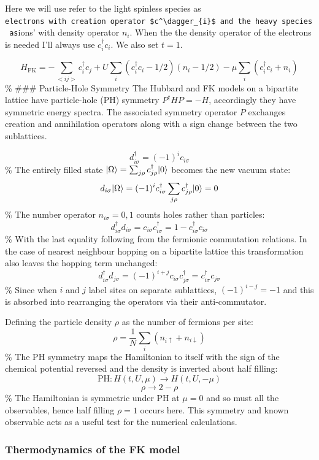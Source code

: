 Here we will use refer to the light spinless species as \texttt{electrons\textquotesingle{}\ with\ creation\ operator\ \$c\^{}\textbackslash{}dagger\_\{i\}\$\ and\ the\ heavy\ species\ as}ions' with density operator \(n_i\). When the the density operator of the electrons is needed I'll always use \(c^\dagger_{i}c_{i}\). We also set \(t = 1\).

\[
    H_{\mathrm{FK}} = -\sum_{<ij>} c^\dagger_{i}c_{j} + U \sum_{i} (c^\dagger_{i}c_{i} - 1/2)( n_i - 1/2) - \mu \sum_i \left(c^\dagger_{i}c_{i} + n_{i}\right)
\] \% \#\#\# Particle-Hole Symmetry The Hubbard and FK models on a bipartite lattice have particle-hole (PH) symmetry \(P^\dagger H P = - H\), accordingly they have symmetric energy spectra. The associated symmetry operator \(P\) exchanges creation and annihilation operators along with a sign change between the two sublattices.

\[ d^\dagger_{i\sigma} = (-1)^i c_{i\sigma}\] \% The entirely filled state \(|\Omega\rangle = \sum_{j\rho} c^\dagger_{j\rho} |0\rangle\) becomes the new vacuum state: \[d_{i\sigma} |\Omega\rangle = (-1)^i c^\dagger_{i\sigma} \sum_{j\rho} c^\dagger_{j\rho} |0\rangle = 0\] \% The number operator \(n_{i\sigma} = 0,1\) counts holes rather than particles: \[ d^\dagger_{i\sigma} d_{i \sigma} = c_{i\sigma} c^\dagger_{i\sigma} = 1 - c^\dagger_{i\sigma} c_{i\sigma}\] \% With the last equality following from the fermionic commutation relations. In the case of nearest neighbour hopping on a bipartite lattice this transformation also leaves the hopping term unchanged: \[ d^\dagger_{i\sigma} d_{j \sigma} = (-1)^{i+j} c_{i\sigma} c^\dagger_{j\sigma} = c^\dagger_{i\sigma} c_{j\sigma} \] \% Since when \(i\) and \(j\) label sites on separate sublattices, \((-1)^{i-j} = -1\) and this is absorbed into rearranging the operators via their anti-commutator.

Defining the particle density \(\rho\) as the number of fermions per site: \[
    \rho = \frac{1}{N} \sum_i \left( n_{i \uparrow} + n_{i \downarrow} \right)
\] \% The PH symmetry maps the Hamiltonian to itself with the sign of the chemical potential reversed and the density is inverted about half filling: \[ \text{PH} : H(t, U, \mu) \rightarrow H(t, U, -\mu) \] \[ \rho \rightarrow 2 - \rho \] \% The Hamiltonian is symmetric under PH at \(\mu = 0\) and so must all the observables, hence half filling \(\rho = 1\) occurs here. This symmetry and known observable acts as a useful test for the numerical calculations.

\hypertarget{thermodynamics-of-the-fk-model}{%
\subsubsection{Thermodynamics of the FK model}\label{thermodynamics-of-the-fk-model}}

